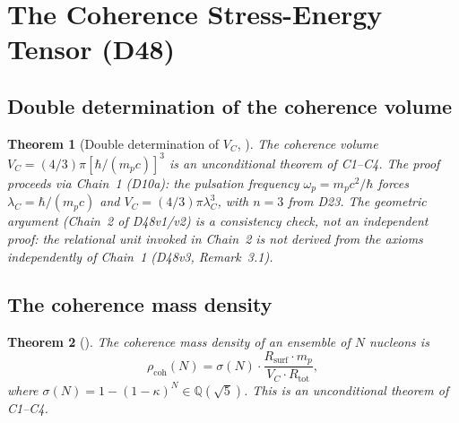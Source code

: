 \documentclass[11pt,a4paper]{article}
\theoremstyle{plain}
\newtheorem{theorem}{Theorem}[section]
\theoremstyle{definition}
\theoremstyle{remark}
\newcommand{\Rsurf}{R_{\mathrm{surf}}}
\newcommand{\Rtot}{R_{\mathrm{tot}}}
\newcommand{\sigmaN}{\sigma(N)}
\newcommand{\rhocoh}{\rho_{\mathrm{coh}}}
\begin{document}
\section{The Coherence Stress-Energy Tensor (D48)}
\label{sec:Ccoh}

\subsection{Double determination of the coherence volume}
\label{subsec:VC}
\begin{theorem}[Double determination of $V_C$, \cite{D48}]
\label{thm:VC}
The coherence volume $V_C = (4/3)\pi[\hbar/(m_p c)]^3$ is an unconditional theorem of C1--C4. The proof proceeds via Chain~1 (D10a): the pulsation frequency $\omega_p = m_p c^2/\hbar$ forces $\lambda_C = \hbar/(m_p c)$ and $V_C = (4/3)\pi\lambda_C^3$, with $n=3$ from D23. The geometric argument (Chain~2 of D48v1/v2) is a consistency check, not an independent proof: the relational unit invoked in Chain~2 is not derived from the axioms independently of Chain~1 (D48v3, Remark~3.1).
\end{theorem}

\subsection{The coherence mass density}
\label{subsec:rhocoh}
\begin{theorem}[\cite{D48}]
\label{thm:rhocoh}
The coherence mass density of an ensemble of $N$ nucleons is
\begin{equation}
\rhocoh(N) = \sigmaN \cdot \frac{\Rsurf \cdot m_p}{V_C \cdot \Rtot},
\end{equation}
where $\sigmaN = 1-(1-\kappa)^N \in \mathbb{Q}(\sqrt{5})$. This is an unconditional theorem of C1--C4.
\end{theorem}
\end{document}
